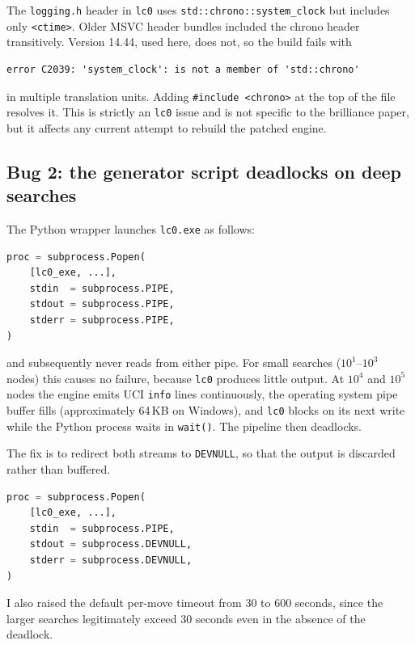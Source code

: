 \documentclass[11pt,a4paper]{article}
\begin{document}
The \texttt{logging.h} header in \texttt{lc0} uses
\texttt{std::chrono::system\_clock} but includes only
\texttt{<ctime>}. Older MSVC header bundles included the chrono header
transitively. Version 14.44, used here, does not, so the build fails
with

\begin{lstlisting}
error C2039: 'system_clock': is not a member of 'std::chrono'
\end{lstlisting}

in multiple translation units. Adding \texttt{\#include <chrono>} at
the top of the file resolves it. This is strictly an \texttt{lc0}
issue and is not specific to the brilliance paper, but it affects any
current attempt to rebuild the patched engine.

\subsection{Bug 2: the generator script deadlocks on deep searches}
\label{sec:bug2}

The Python wrapper launches \texttt{lc0.exe} as follows:

\begin{lstlisting}[language=Python]
proc = subprocess.Popen(
    [lc0_exe, ...],
    stdin  = subprocess.PIPE,
    stdout = subprocess.PIPE,
    stderr = subprocess.PIPE,
)
\end{lstlisting}

and subsequently never reads from either pipe. For small searches
($10^1$--$10^3$ nodes) this causes no failure, because \texttt{lc0}
produces little output. At $10^4$ and $10^5$ nodes the engine emits UCI
\texttt{info} lines continuously, the operating system pipe buffer
fills (approximately 64\,KB on Windows), and \texttt{lc0} blocks on its
next write while the Python process waits in \texttt{wait()}. The
pipeline then deadlocks.

The fix is to redirect both streams to \texttt{DEVNULL}, so that the
output is discarded rather than buffered.

\begin{lstlisting}[language=Python]
proc = subprocess.Popen(
    [lc0_exe, ...],
    stdin  = subprocess.PIPE,
    stdout = subprocess.DEVNULL,
    stderr = subprocess.DEVNULL,
)
\end{lstlisting}

I also raised the default per-move timeout from 30 to 600 seconds,
since the larger searches legitimately exceed 30 seconds even in the
absence of the deadlock.
\end{document}
